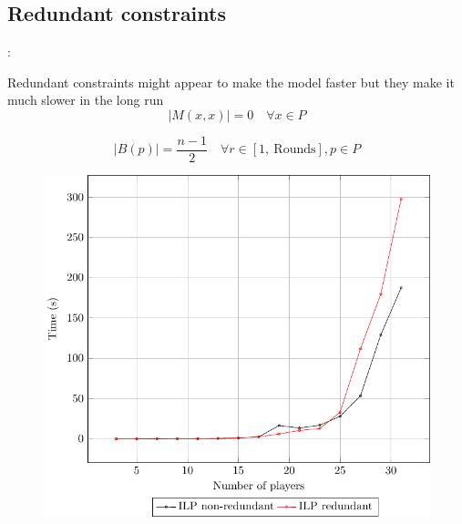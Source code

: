 \documentclass[9pt, aspectratio=169, xcolor=table]{beamer}
\begin{document}
\subsection{Redundant constraints}
\begin{frame}{\secname: \subsecname}
    \begin{minipage}{0.40\textwidth}
	Redundant constraints might appear to make the model faster but they make it much slower in the long run
	\begin{equation*}
	    \label{noselfplay}
	    |M(x,x)| = 0 \quad \forall x \in P 
	\end{equation*}

	\begin{equation*}
	    \label{blackfairness}
	    |B(p)| = \frac{n-1}{2} \quad \forall r \in [1, \ \text{Rounds}], p \in P
	\end{equation*}

    \end{minipage}
    \hfill
    \begin{minipage}{0.57\textwidth}
	\begin{figure}[h]
	    \includegraphics[width=\linewidth]{../plots/time_per_instance.pdf}
	\end{figure}
    \end{minipage}

\end{frame}
\end{document}
